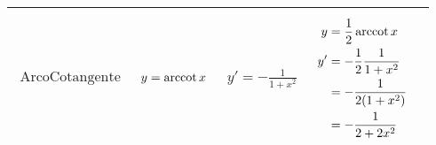 \documentclass[../../main]{subfiles}
\begin{document}
\begin{center}
\begin{longtable}{ |p{7em}|p{5em}|p{5em}|p{7em}|p{5cm}| }
        \begin{align*}
            \text{ArcoCotangente}
        \end{align*} &
        {
            \begin{align*}
                y=\operatorname{arccot}{x} 
            \end{align*}  
        }&
        {
            \begin{align*}
                y'= -\frac{1}{1+x^2} 
            \end{align*} 
        }&
        {
            \begin{align*}
                y &= \frac{1}{2}\operatorname{arccot}{x}  \\
                y' &= -\frac{1}{2} \frac{1}{1+x^2}  \\
                    &= -\frac{1}{2(1+x^2)}  \\
                    &= -\frac{1}{2+2x^2} 
            \end{align*}
        } &
        {
        \begin{center}
        \end{center}
        } \\

        \hline
        
        
    \end{longtable}
\end{center}
\end{document}
